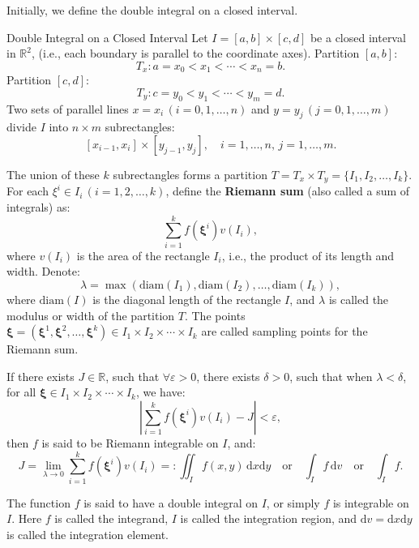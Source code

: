 \documentclass[11pt]{../../TexTemplate/elegantbook}
\begin{document}
Initially, we define the double integral on a closed interval.
\begin{definition}{Double Integral on a Closed Interval}
    Let \( I = [a, b] \times [c, d] \) be a closed interval in \( \mathbb{R}^2 \), 
    (i.e., each boundary is parallel to the coordinate axes). Partition \( [a, b] \):
    \[
    T_x: a = x_0 < x_1 < \cdots < x_n = b.
    \]
    Partition \( [c, d] \):
    \[
    T_y: c = y_0 < y_1 < \cdots < y_m = d.
    \]
    Two sets of parallel lines \( x = x_i \, (i = 0, 1, \ldots, n) \) and \( y = y_j \, (j = 0, 1, \ldots, m) \) 
    divide \( I \) into \( n \times m \) subrectangles:
    \[
    [x_{i-1}, x_i] \times [y_{j-1}, y_j], \quad i = 1, \ldots, n, \, j = 1, \ldots, m.
    \]

    The union of these \( k \) subrectangles forms a partition \( T = T_x \times T_y = \{ I_1, I_2, \ldots, I_k \} \). 
    For each \( \xi^i \in I_i \, (i = 1, 2, \ldots, k) \), define the \textbf{Riemann sum} (also called a sum of integrals) as:
    \[
    \sum_{i=1}^k f(\boldsymbol{\xi}^i) v(I_i),
    \]
    where \( v(I_i) \) is the area of the rectangle \( I_i \), i.e., the product of its length and width. Denote:
    \[
    \lambda = \max(\text{diam}(I_1), \text{diam}(I_2), \ldots, \text{diam}(I_k)),
    \]
    where \( \text{diam}(I) \) is the diagonal length of the rectangle \( I \), 
    and \( \lambda \) is called the modulus or width of the partition \( T \). 
    The points 
    \( \boldsymbol{\xi} = (\boldsymbol{\xi}^1, \boldsymbol{\xi}^2, \ldots, \boldsymbol{\xi}^k) 
    \in I_1 \times I_2 \times \cdots \times I_k \) 
    are called sampling points for the Riemann sum.

    If there exists \( J \in \mathbb{R} \), such that \( \forall \varepsilon > 0 \), there exists \( \delta > 0 \), 
    such that when \( \lambda < \delta \), for all \( \boldsymbol{\xi} \in I_1 \times I_2 \times \cdots \times I_k \), we have:
    \[
    \left| \sum_{i=1}^k f(\boldsymbol{\xi}^i) v(I_i) - J \right| < \varepsilon,
    \]
    then \( f \) is said to be Riemann integrable on \( I \), and:
    \[
    J = \lim_{\lambda \to 0} \sum_{i=1}^k f(\boldsymbol{\xi}^i) v(I_i) =: 
    \iint_I f(x, y) \, \mathrm{d}x \mathrm{d}y \quad \text{or} \quad \int_I f \, \mathrm{d}v \quad \text{or} \quad \int_{I} f.
    \]

    The function \( f \) is said to have a double integral on \( I \), or simply \( f \) is integrable on \( I \). 
    Here \( f \) is called the integrand, \( I \) is called the integration region, 
    and \( \mathrm{d}v = \mathrm{d}x \mathrm{d}y \) is called the integration element.
\end{definition}
\end{document}
